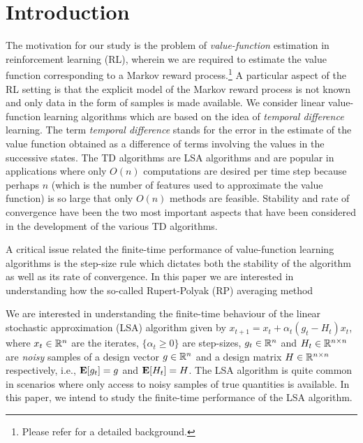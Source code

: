 \section{Introduction}

The motivation for our study is the problem of \emph{value-function} estimation in reinforcement learning (RL), wherein we are required to estimate the value function corresponding to a Markov reward process.\footnote{Please refer \cite{BertB} for a detailed background.} A particular aspect of the RL setting is that the explicit model of the Markov reward process is not known and only data in the form of samples is made available. We consider linear value-function learning algorithms which are based on the idea of \emph{temporal difference} learning.
The term \emph{temporal difference} stands for the  error in the estimate of the value function obtained as a difference of terms involving the values in the successive states. The TD algorithms are LSA algorithms and are popular in applications where only $O(n)$ computations are desired per time step because perhaps $n$ (which is the number of features used to approximate the value function) is so large that only $O(n)$ methods are feasible. Stability and rate of convergence have been the two most important aspects that have been considered in the development of the various TD algorithms. 

A critical issue related the finite-time performance of value-function learning algorithms is the step-size rule which dictates both the stability of the algorithm as well as its rate of convergence. In this paper we are interested in understanding how the so-called Rupert-Polyak (RP) averaging method

We are interested in understanding the finite-time behaviour of the linear stochastic approximation (LSA) algorithm given by $x_{t+1}=x_t+\alpha_t(g_t-H_t)x_t$, where $x_t\in \mathbb{R}^n$ are the iterates, $\{\alpha_t\geq 0\}$ are step-sizes, $g_t\in \mathbb{R}^n$ and $H_t\in \mathbb{R}^{n\times n}$ are \emph{noisy} samples of a design vector $g\in\mathbb{R}^n$ and a design matrix $H\in\mathbb{R}^{n\times n}$ respectively, i.e., $\mathbf{E}[g_t]=g$ and $\mathbf{E}[H_t]=H$. The LSA algorithm is quite common in scenarios where only access to noisy samples of true quantities is available. In this paper, we intend to study the finite-time performance of the LSA algorithm.



